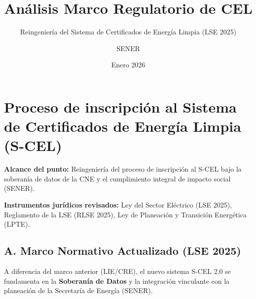 \documentclass{cel}
\title{Análisis Marco Regulatorio de CEL}
\subtitle{Reingeniería del Sistema de Certificados de Energía Limpia (LSE 2025)}
\author{SENER}
\date{Enero 2026}
\begin{document}


\tableofcontents
\newpage


\clearpage
{}
\setcounter{page}{1}
{}
\section*{Proceso de inscripción al Sistema de Certificados de Energía Limpia (S-CEL)}
\nopagebreak

\textbf{Alcance del punto:} Reingeniería del proceso de inscripción al S-CEL bajo la soberanía de datos de la CNE y el cumplimiento integral de impacto social (SENER).

\textbf{Instrumentos jurídicos revisados:} Ley del Sector Eléctrico (LSE 2025), Reglamento de la LSE (RLSE 2025), Ley de Planeación y Transición Energética (LPTE).



\subsection{A. Marco Normativo Actualizado (LSE 2025)}
\nopagebreak

A diferencia del marco anterior (LIE/CRE), el nuevo sistema S-CEL 2.0 se fundamenta en la \textbf{Soberanía de Datos} y la integración vinculante con la planeación de la Secretaría de Energía (SENER).
\end{document}
